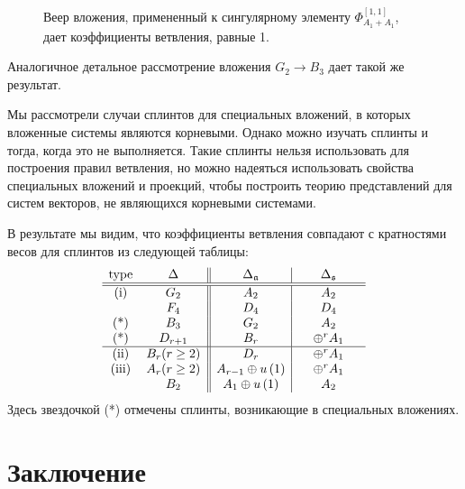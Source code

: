\documentclass[12pt]{article}
\newcommand{\sfr}{\mathfrak{s}}
\begin{document}
\begin{figure}[h]
\begin{center}
\begin{minipage}[h]{0.47\linewidth}
\caption{Веер вложения, примененный к сингулярному элементу $\Phi_{A_1+A_1}^{[1,1]}$, дает
  коэффициенты ветвления, равные  1.}
\label{ris2}
\end{minipage}
\end{center}
\end{figure}

Аналогичное детальное рассмотрение вложения $G_{2}\to B_{3}$ дает такой же результат.

Мы рассмотрели случаи сплинтов для специальных вложений, в которых вложенные системы являются
корневыми. Однако можно изучать сплинты и тогда, когда это не выполняется. Такие сплинты нельзя
использовать для построения правил ветвления, но можно надеяться использовать свойства специальных
вложений и проекций, чтобы построить теорию представлений для систем векторов, не являющихся
корневыми системами. 

В результате мы видим, что коэффициенты ветвления совпадают с кратностями весов для сплинтов из
следующей таблицы:
\begin{equation}
\label{tab:2}
\begin{array}{cc||c|c}
\hbox{type} & \hspace{0.25in}\Delta \hspace{0.25in} & \hspace{0.25in}\Delta
_{\frak{a}}\hspace{0.25in} & \hspace{0.25in}\Delta _{\sfr}\hspace{0.25in}
\\ \hline\hline
\hbox{(i)} & G_{2} & A_{2} & A_{2} \\
& F_{4} & D_{4} & D_{4} \\ 
\hbox{(*)} & B_{3} & G_{2} & A_{2}  \\
\hbox{(*)} & D_{r+1} & B_{r} & \oplus ^{r}A_{1}  \\
\hline
\hbox{(ii)} & B_{r}(r\geq 2) & D_{r} & \oplus ^{r}A_{1} \\
\hbox{(iii)} & A_{r}(r\geq 2) & A_{r-1}\oplus u\left( 1\right)  & \oplus
^{r}A_{1} \\
& B_{2} & A_{1}\oplus u\left( 1\right)  & A_{2}
\end{array}
\end{equation} 
Здесь звездочкой (*) отмечены сплинты, возникающие в специальных вложениях. 


\section{Заключение}
\label{sec:conclusion}
\end{document}
